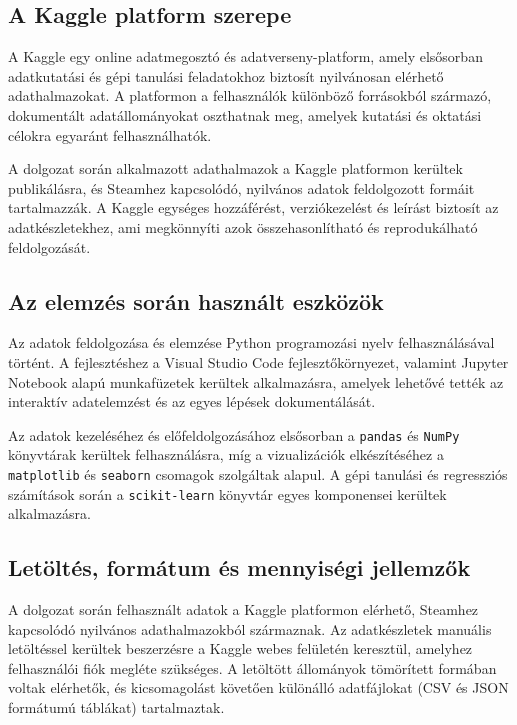 \subsection{A Kaggle platform szerepe}

A Kaggle \cite{kaggle} egy online adatmegosztó és adatverseny-platform, amely elsősorban adatkutatási és gépi tanulási feladatokhoz biztosít nyilvánosan elérhető adathalmazokat. A platformon a felhasználók különböző forrásokból származó, dokumentált adatállományokat oszthatnak meg, amelyek kutatási és oktatási célokra egyaránt felhasználhatók.

A dolgozat során alkalmazott adathalmazok a Kaggle platformon kerültek publikálásra, és Steamhez kapcsolódó, nyilvános adatok feldolgozott formáit tartalmazzák. A Kaggle egységes hozzáférést, verziókezelést és leírást biztosít az adatkészletekhez, ami megkönnyíti azok összehasonlítható és reprodukálható feldolgozását.

\subsection{Az elemzés során használt eszközök}

Az adatok feldolgozása és elemzése Python \cite{python} programozási nyelv
felhasználásával történt. A fejlesztéshez a Visual Studio Code \cite{vscode}
fejlesztőkörnyezet, valamint Jupyter Notebook \cite{jupyter} alapú munkafüzetek
kerültek alkalmazásra, amelyek lehetővé tették az interaktív
adatelemzést és az egyes lépések dokumentálását.

Az adatok kezeléséhez és előfeldolgozásához elsősorban a \texttt{pandas}  \cite{pandas}
és \texttt{NumPy} \cite{numpy} könyvtárak kerültek felhasználásra, míg a
vizualizációk elkészítéséhez a \texttt{matplotlib} \cite{matplotlib} és
\texttt{seaborn} \cite{seaborn} csomagok szolgáltak alapul. A gépi tanulási és
regressziós számítások során a \texttt{scikit-learn} \cite{scikit} könyvtár
egyes komponensei kerültek alkalmazásra.

\subsection{Letöltés, formátum és mennyiségi jellemzők}

A dolgozat során felhasznált adatok a Kaggle \cite{kaggle} platformon elérhető,
Steamhez \cite{steam} kapcsolódó nyilvános adathalmazokból származnak.
Az adatkészletek manuális letöltéssel kerültek beszerzésre a Kaggle webes felületén
keresztül, amelyhez felhasználói fiók megléte szükséges.
A letöltött állományok tömörített formában voltak elérhetők, és kicsomagolást
követően különálló adatfájlokat (CSV és JSON formátumú táblákat) tartalmaztak.

